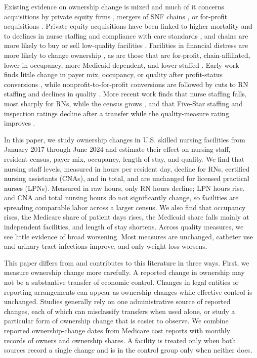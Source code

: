 \documentclass[12pt]{article}
\begin{document}
Existing evidence on ownership change is mixed and much of it concerns acquisitions by private equity firms \citep{GuptaEtAl2024, NBERw34306, huang_bowblis_2019}, mergers of SNF chains \citep{Hirth2019EffectsOfChains, Grabowski2016LowQualityNH}, or for-profit acquisitions \citep{grabowski_stevenson_2008, sutton_et_al_2024}. Private equity acquisitions have been linked to higher mortality and to declines in nurse staffing and compliance with care standards \citep{GuptaEtAl2024}, and chains are more likely to buy or sell low-quality facilities \citep{Grabowski2016LowQualityNH}. Facilities in financial distress are more likely to change ownership \citep{bowblis_2011, lu_lu_2022}, as are those that are for-profit, chain-affiliated, lower in occupancy, more Medicaid-dependent, and lower-staffed \citep{prusynski_humbert_mroz_2023}. Early work finds little change in payer mix, occupancy, or quality after profit-status conversions \citep{grabowski_stevenson_2008}, while nonprofit-to-for-profit conversions are followed by cuts to RN staffing and declines in quality \citep{lu_lu_2022}. More recent work finds that nurse staffing falls, most sharply for RNs, while the census grows \citep{RyskinaEtAl2024, prusynski_et_al_2025}, and that Five-Star staffing and inspection ratings decline after a transfer while the quality-measure rating improves \citep{RyskinaEtAl2024}.

In this paper, we study ownership changes in U.S. skilled nursing facilities from January 2017 through June 2024 and estimate their effect on nursing staff, resident census, payer mix, occupancy, length of stay, and quality. We find that nursing staff levels, measured in hours per resident day, decline for RNs, certified nursing assistants (CNAs), and in total, and are unchanged for licensed practical nurses (LPNs). Measured in raw hours, only RN hours decline; LPN hours rise, and CNA and total nursing hours do not significantly change, so facilities are spreading comparable labor across a larger census. We also find that occupancy rises, the Medicare share of patient days rises, the Medicaid share falls mainly at independent facilities, and length of stay shortens. Across quality measures, we see little evidence of broad worsening. Most measures are unchanged, catheter use and urinary tract infections improve, and only weight loss worsens.

This paper differs from and contributes to this literature in three ways. First, we measure ownership change more carefully. A reported change in ownership may not be a substantive transfer of economic control. Changes in legal entities or reporting arrangements can appear as ownership changes while effective control is unchanged. Studies generally rely on one administrative source of reported changes, each of which can misclassify transfers when used alone, or study a particular form of ownership change that is easier to observe. We combine reported ownership-change dates from Medicare cost reports with monthly records of owners and ownership shares. A facility is treated only when both sources record a single change and is in the control group only when neither does.
\end{document}
